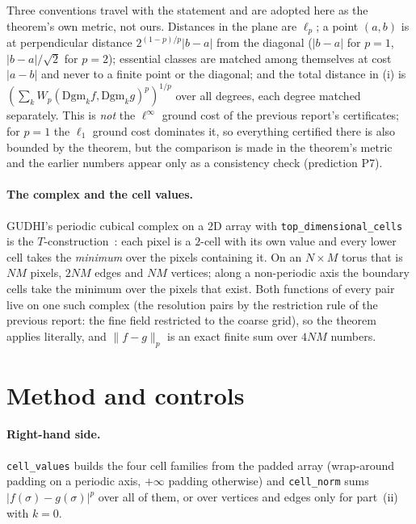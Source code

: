 \documentclass[11pt,a4paper]{article}
\newcommand{\lean}[1]{\texttt{\small #1}}
\newcommand{\Dgm}{\mathrm{Dgm}}
\begin{document}
Three conventions travel with the statement and are adopted here as the theorem's own metric, not
ours. Distances in the plane are $\ell_p$; a point $(a,b)$ is at perpendicular distance
$2^{(1-p)/p}|b-a|$ from the diagonal ($|b-a|$ for $p=1$, $|b-a|/\sqrt2$ for $p=2$); essential classes
are matched among themselves at cost $|a-b|$ and never to a finite point or the diagonal; and the
total distance in (i) is $(\sum_k W_p(\Dgm_k f,\Dgm_k g)^p)^{1/p}$ over all degrees, each degree
matched separately. This is \emph{not} the $\ell^\infty$ ground cost of the previous report's
certificates; for $p=1$ the $\ell_1$ ground cost dominates it, so everything certified there is also
bounded by the theorem, but the comparison is made in the theorem's metric and the earlier numbers
appear only as a consistency check (prediction P7).

\paragraph{The complex and the cell values.} GUDHI's periodic cubical complex on a $2$D array with
\lean{top\_dimensional\_cells} is the $T$-construction~\cite{Bleile2021,GUDHI}: each pixel is a
$2$-cell with its own value and every lower cell takes the \emph{minimum} over the pixels containing
it. On an $N\times M$ torus that is $NM$ pixels, $2NM$ edges and $NM$ vertices; along a non-periodic
axis the boundary cells take the minimum over the pixels that exist. Both functions of every pair live
on one such complex (the resolution pairs by the restriction rule of the previous report: the fine
field restricted to the coarse grid), so the theorem applies literally, and $\|f-g\|_p$ is an exact
finite sum over $4NM$ numbers.

\section{Method and controls}
\label{sec:method}

\paragraph{Right-hand side.} \lean{cell\_values} builds the four cell families from the padded array
(wrap-around padding on a periodic axis, $+\infty$ padding otherwise) and \lean{cell\_norm} sums
$|f(\sigma)-g(\sigma)|^p$ over all of them, or over vertices and edges only for part~(ii) with $k=0$.
\end{document}
